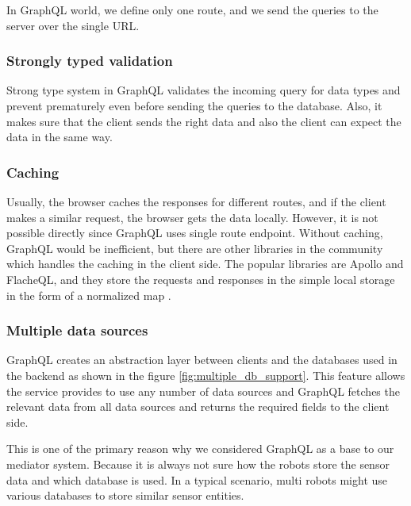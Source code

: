 	In GraphQL world, we define only one route, and we send the queries to the server over the single URL.
	
	\subsubsection{Strongly typed validation}
	Strong type system in GraphQL validates the incoming query for data types and prevent prematurely even before sending the queries to the database. Also, it makes sure that the client sends the right data and also the client can expect the data in the same way. 
	
	\subsubsection{Caching}
	Usually, the browser caches the responses for different routes, and if the client makes a similar request, the browser gets the data locally. However, it is not possible directly since GraphQL uses single route endpoint. Without caching, GraphQL would be inefficient, but there are other libraries in the community which handles the caching in the client side. The popular libraries are Apollo and FlacheQL, and they store the requests and responses in the simple local storage in the form of a normalized map \cite{misc02}.
	
	\subsubsection{Multiple data sources}
	GraphQL creates an abstraction layer between clients and the databases used in the backend as shown in the figure \ref{fig:multiple_db_support}. This feature allows the service provides to use any number of data sources and GraphQL fetches the relevant data from all data sources and returns the required fields to the client side. 
	
	This is one of the primary reason why we considered GraphQL as a base to our mediator system. Because it is always not sure how the robots store the sensor data and which database is used. In a typical scenario, multi robots might use various databases to store similar sensor entities.

